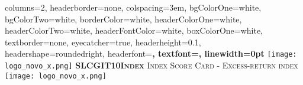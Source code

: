 \documentclass[landscape,a4paper,fontscale=1.2,margin=3em]{baposter} %
\begin{document}
\begin{poster}
{
columns=2,
headerborder=none, %
colspacing=3em, %
bgColorOne=white, %
bgColorTwo=white, %
borderColor=white, %
headerColorOne=white, %
headerColorTwo=white, %
headerFontColor=white, %
boxColorOne=white, %
textborder=none, %
eyecatcher=true, %
headerheight=0.1\textheight, %
headershape=roundedright, %
headerfont=\Large\bf\textsc, %
textfont=\Large,
linewidth=0pt %
}
%
{\texttt{[image: logo\_novo\_x.png]}} %
{\bf\textsc{SLCGIT10\hspace{0.5em}Index}\vspace{0.6em}} %
{\textsc{ Index Score Card \hspace{0.3em}-\hspace{0.3em} Excess-return index}} %
{\texttt{[image: logo\_novo\_x.png]}} %



\end{poster}
\end{document}
